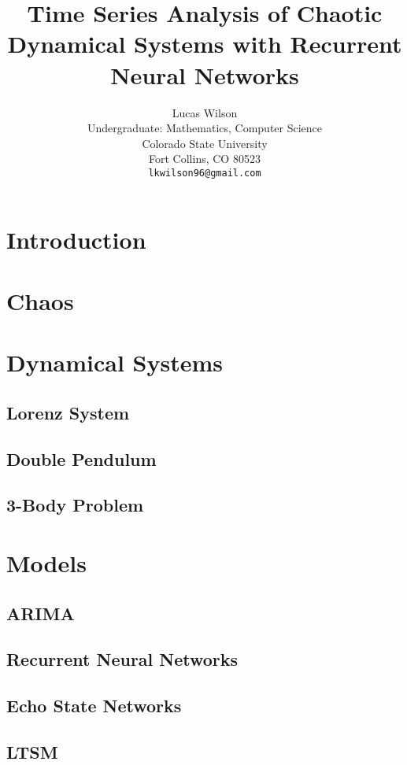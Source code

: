 \documentclass{article}
\title{Time Series Analysis of Chaotic Dynamical Systems with Recurrent Neural Networks}
\author{
  Lucas Wilson \\
  Undergraduate: Mathematics, Computer Science \\
  Colorado State University\\
  Fort Collins, CO 80523 \\
  \texttt{lkwilson96@gmail.com} \\
}
\begin{document}
\maketitle

\begin{abstract}
\end{abstract}

\section{Introduction}
\lipsum

\section{Chaos}
\lipsum

\section{Dynamical Systems}
\lipsum

\subsection{Lorenz System}
\lipsum
\subsection{Double Pendulum}
\lipsum
\subsection{3-Body Problem}
\lipsum

\section{Models}
\lipsum

\subsection{ARIMA}
\lipsum
\subsection{Recurrent Neural Networks}
\lipsum
\subsection{Echo State Networks}
\lipsum
\subsection{LTSM}
\lipsum
\end{document}
